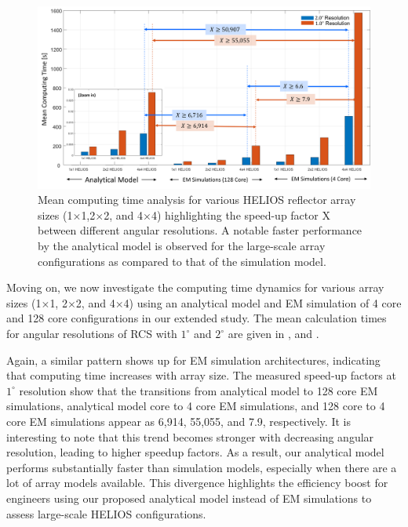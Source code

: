 \begin{figure}[tb]
	\centering
	\includegraphics[width=1.0\linewidth]{images/Section 4 Images/Computing_time_resolution}
	\caption{Mean computing time analysis for various HELIOS reflector array sizes (\num{1}$\times$\num{1},\num{2}$\times$\num{2}, and \num{4}$\times$\num{4}) highlighting the speed-up factor X between different angular resolutions. A notable faster performance by the analytical model is observed for the large-scale array configurations as compared to that of the simulation model. }
	\label{fig:Computing_time_resolution}
\end{figure}
Moving on, we now investigate the computing time dynamics for various array sizes (\num{1}$\times$\num{1}, \num{2}$\times$\num{2}, and \num{4}$\times$\num{4}) using an analytical model and EM simulation of 4 core and 128 core configurations in our extended study. The mean calculation times for angular resolutions of RCS with $\num{1}^\circ$ and $\num{2}^\circ$ are given in , and .  

Again, a similar pattern shows up for EM simulation architectures, indicating that computing time increases with array size. The measured speed-up factors at $\num{1}^\circ$ resolution show that the transitions from analytical model to \num{128} core EM simulations, analytical model core to \num{4} core EM simulations, and \num{128} core to \num{4} core EM simulations appear as 6,914, 55,055, and 7.9, respectively. It is interesting to note that this trend becomes stronger with decreasing angular resolution, leading to higher speedup factors. As a result, our analytical model performs substantially faster than simulation models, especially when there are a lot of array models available. This divergence highlights the efficiency boost for engineers using our proposed analytical model instead of EM simulations to assess large-scale HELIOS configurations.
